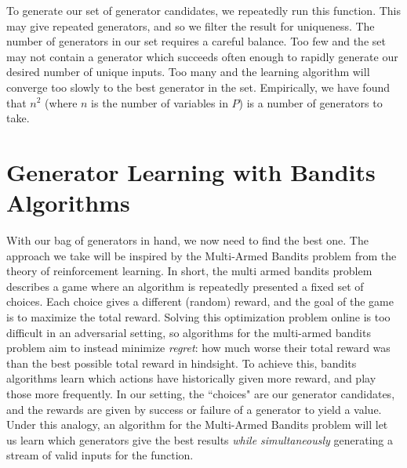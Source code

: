 \documentclass[sigconf,nonacm,review,anonymous]{acmart}
\begin{document}
      

      
      

To generate our set of generator candidates, we repeatedly run this function.
This may give repeated generators, and so we filter the result for uniqueness.
The number of generators in our set requires a careful
balance. Too few and the set may not contain a generator which succeeds often
enough to rapidly generate our desired number of unique inputs. Too many and the
learning algorithm will converge too slowly to the best generator in the set.
Empirically, we have found that $n^2$ (where $n$ is the number of variables in
$P$) is a number of generators to take.

\section{Generator Learning with Bandits Algorithms}
\label{sec:bandits}
With our bag of generators in hand, we now need to find the best one. The
approach we take will be inspired by the Multi-Armed Bandits
\cite{gittins1979bandit} problem from the theory of reinforcement learning. In short, the multi armed
bandits problem describes a game where an algorithm is repeatedly presented
a fixed set of choices. Each choice gives a different (random) reward, and the
goal of the game is to maximize the total reward. Solving this optimization problem
online is too difficult in an adversarial setting, so algorithms for the multi-armed
bandits problem aim to instead minimize \emph{regret}: how much worse their total reward
was than the best possible total reward in hindsight. To achieve this, bandits algorithms
learn which actions have historically given more reward, and play those more frequently.
In our setting, the ``choices" are our
generator candidates, and the rewards are given by success or failure of a
generator to yield a value. Under this analogy, an algorithm for the Multi-Armed
Bandits problem will let us learn which generators give the best results
\textit{while simultaneously} generating a stream of valid inputs for the
function.
\end{document}
